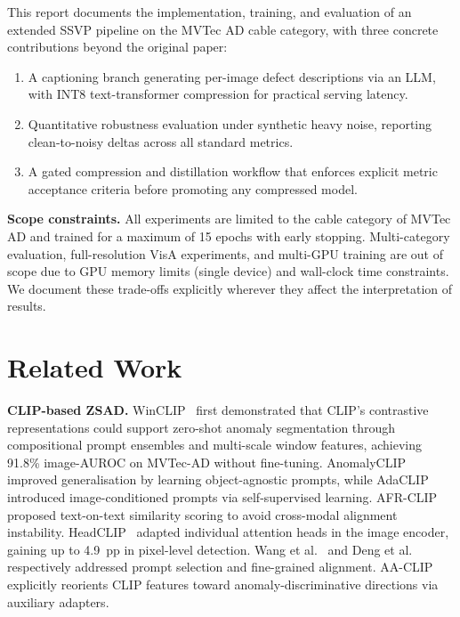 \documentclass[11pt]{article}
\begin{document}
This report documents the implementation, training, and evaluation of an extended
SSVP pipeline on the MVTec AD cable category, with three concrete contributions
beyond the original paper:

\begin{enumerate}[leftmargin=*,topsep=2pt,itemsep=1pt]
  \item A captioning branch generating per-image defect descriptions via an LLM,
        with INT8 text-transformer compression for practical serving latency.
  \item Quantitative robustness evaluation under synthetic heavy noise, reporting
        clean-to-noisy deltas across all standard metrics.
  \item A gated compression and distillation workflow that enforces explicit
        metric acceptance criteria before promoting any compressed model.
\end{enumerate}

\noindent\textbf{Scope constraints.} All experiments are limited to the cable
category of MVTec AD and trained for a maximum of 15 epochs with early stopping.
Multi-category evaluation, full-resolution VisA experiments, and multi-GPU training
are out of scope due to GPU memory limits (single device) and wall-clock time
constraints. We document these trade-offs explicitly wherever they affect the
interpretation of results.

\section{Related Work}

\textbf{CLIP-based ZSAD.}
WinCLIP~\cite{jeong2023winclip} first demonstrated that CLIP's contrastive
representations could support zero-shot anomaly segmentation through compositional
prompt ensembles and multi-scale window features, achieving 91.8\% image-AUROC on
MVTec-AD without fine-tuning. AnomalyCLIP~\cite{zhou2024anomalyclip} improved
generalisation by learning object-agnostic prompts, while AdaCLIP~\cite{cai2024adaclip}
introduced image-conditioned prompts via self-supervised learning. AFR-CLIP~\cite{yuan2025afrclip}
proposed text-on-text similarity scoring to avoid cross-modal alignment instability.
HeadCLIP~\cite{jeong2026headclip} adapted individual attention heads in the image
encoder, gaining up to 4.9~pp in pixel-level detection. Wang et al.~\cite{wang2024dualbranch}
and Deng et al.~\cite{deng2024anoclip} respectively addressed prompt selection and
fine-grained alignment. AA-CLIP~\cite{ma2025aaclip} explicitly reorients CLIP
features toward anomaly-discriminative directions via auxiliary adapters.
\end{document}
